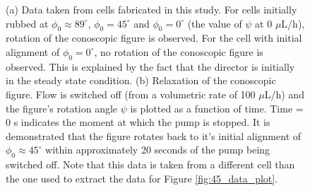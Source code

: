 \begin{figure}
\begin{center}
\end{center}
\caption[Conoscopic figure rotation for different $\phi_0$ and terminating flow]{\label{fig:time_relax} (a) Data taken from cells fabricated in this study. For cells initially rubbed at $\phi_0\approx89^{\circ}$, $\phi_0=45^{\circ}$ and $\phi_0=0^{\circ}$ (the value of $\psi$ at 0 $\mu$L/h), rotation of the conoscopic figure is observed. For the cell with initial alignment of $\phi_0=0^{\circ}$, no rotation of the conoscopic figure is observed. This is explained by the fact that the director is initially in the steady state condition. (b) Relaxation of the conoscopic figure. Flow is switched off (from a volumetric rate of 100 $\mu$L/h) and the figure's rotation angle $\psi$ is plotted as a function of time. Time = 0 s indicates the moment at which the pump is stopped. It is demonstrated that the figure rotates back to it's initial alignment of $\phi_0\approx45^{\circ}$ within approximately 20 seconds of the pump being switched off. Note that this data is taken from a different cell than the one used to extract the data for Figure \ref{fig:45_data_plot}.}
\end{figure}


